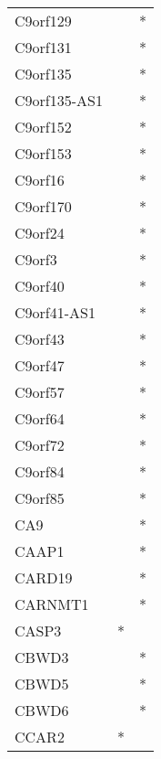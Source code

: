 \begin{longtable}{lcc}
C9orf129              &                &          * \\
C9orf131              &                &          * \\
C9orf135              &                &          * \\
C9orf135-AS1          &                &          * \\
C9orf152              &                &          * \\
C9orf153              &                &          * \\
C9orf16               &                &          * \\
C9orf170              &                &          * \\
C9orf24               &                &          * \\
C9orf3                &                &          * \\
C9orf40               &                &          * \\
C9orf41-AS1           &                &          * \\
C9orf43               &                &          * \\
C9orf47               &                &          * \\
C9orf57               &                &          * \\
C9orf64               &                &          * \\
C9orf72               &                &          * \\
C9orf84               &                &          * \\
C9orf85               &                &          * \\
CA9                   &                &          * \\
CAAP1                 &                &          * \\
CARD19                &                &          * \\
CARNMT1               &                &          * \\
CASP3                 &              * &            \\
CBWD3                 &                &          * \\
CBWD5                 &                &          * \\
CBWD6                 &                &          * \\
CCAR2                 &              * &            \\

\end{longtable}
